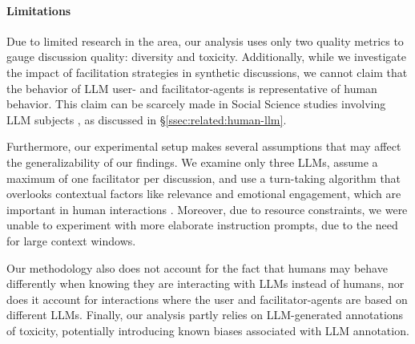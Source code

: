 %
\paragraph{Limitations} 
Due to limited research in the area, our analysis uses only two quality metrics to gauge discussion quality: diversity and toxicity. Additionally, while we investigate the impact of facilitation strategies in synthetic discussions, we cannot claim that the behavior of LLM user- and facilitator-agents is representative of human behavior. This claim can be scarcely made in Social Science studies involving LLM subjects \cite{rossi_2024, zhou-etal-2024-real}, as discussed in \S\ref{ssec:related:human-llm}.

Furthermore, our experimental setup makes several assumptions that may affect the generalizability of our findings. We examine only three LLMs, assume a maximum of one facilitator per discussion, and use a turn-taking algorithm that overlooks contextual factors like relevance and emotional engagement, which are important in human interactions \cite{robert_2016_comment, Ziegele03102018}. Moreover, due to resource constraints, we were unable to experiment with more elaborate instruction prompts, due to the need for large context windows. 

Our methodology also does not account for the fact that humans may behave differently when knowing they are interacting with LLMs instead of humans, nor  does it account for interactions where the user and facilitator-agents are based on different LLMs. Finally, our analysis partly relies on LLM-generated annotations of toxicity, potentially introducing known biases associated with LLM annotation.